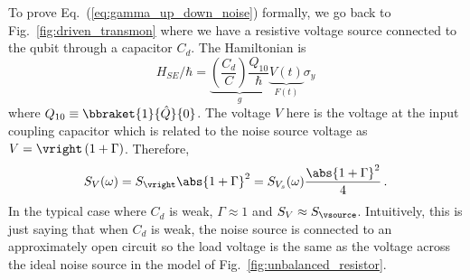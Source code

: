 To prove Eq.~(\ref{eq:gamma_up_down_noise}) formally, we go back to Fig.~\ref{fig:driven_transmon} where we have a resistive voltage source connected to the qubit through a capacitor $C_d$.
The Hamiltonian is
\begin{equation}
  H_{SE} / \hbar = \underbrace{\left( \frac{C_d}{C} \right) \frac{Q_{10}}{\hbar}}_g \underbrace{V(t)}_{F(t)} \sigma_y
\end{equation}
where $Q_{10} \equiv \bbraket{1}{\hat Q}{0}$.
The voltage $V$ here is the voltage at the input coupling capacitor which is related to the noise source voltage as $V = \vright \left( 1 + \Gamma \right)$.
Therefore,
\begin{equation}
    S_V(\omega) = S_{\vright} \abs{1 + \Gamma}^2 = S_{V_s}(\omega) \frac{\abs{1 + \Gamma}^2}{4}
    \, .
\end{equation}
In the typical case where $C_d$ is weak, $\Gamma \approx 1$ and $S_V \approx S_{\vsource}$.
Intuitively, this is just saying that when $C_d$ is weak, the noise source is connected to an approximately open circuit so the load voltage is the same as the voltage across the ideal noise source in the model of Fig.~\ref{fig:unbalanced_resistor}.

